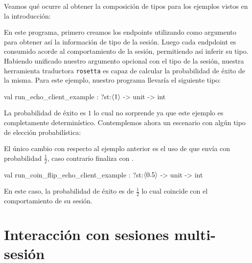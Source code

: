 Veamos qué ocurre al obtener la composición de tipos para los ejemplos vistos en la introducción:

\EchoClientClosedSession

En este programa, primero creamos los endpoints utilizando  como
argumento para obtener así la información de tipo de la sesión. Luego cada
endpdoint es consumido acorde al comportamiento de la sesión, permitiendo así
inferir su tipo. Habiendo unificado nuestro argumento opcional  con el
tipo de la sesión, nuestra herramienta traductora \texttt{rosetta} es capaz de
calcular la probabilidad de éxito de la misma. Para este ejemplo, nuestro programa
 llevaría el siguiente tipo:

\begin{table}[htb]
	\begin{OCamlD}
    val run_echo_client_example : ?st:$\ClosedSessionType[1]$ -> unit -> int
	\end{OCamlD}
\end{table}

La probabilidad de éxito es $1$ lo cual no sorprende ya que este ejemplo es
completamente determinístico. Contemplemos ahora un escenario con algún tipo de
elección probabilística:

\CoinFlipEchoClientClosedSession

El único cambio con respecto al ejemplo anterior es el uso de
 que envía con probabilidad $\frac{1}{2}$, caso
contrario finaliza con .

\begin{table}[htb]
	\begin{OCamlD}
 val run_coin_flip_echo_client_example : ?st:$\ClosedSessionType[0.5]$ -> unit -> int
	\end{OCamlD}
\end{table}

En este caso, la probabilidad de éxito es de $\frac{1}{2}$ lo cual coincide con
el comportamiento de su sesión.

\section{Interacción con sesiones multi-sesión}
